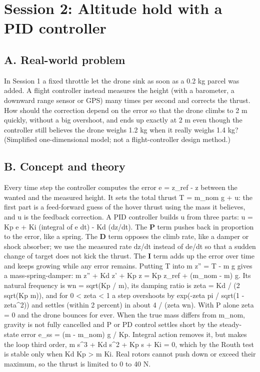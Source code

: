 \documentclass[11pt,a4paper]{article}
\begin{document}
\section{Session 2: Altitude hold with a PID controller}

\subsection*{A. Real-world problem}
In Session 1 a fixed throttle let the drone sink as soon as a 0.2 kg parcel was added. A flight controller instead measures the height (with a barometer, a downward range sensor or GPS) many times per second and corrects the thrust. How should the correction depend on the error so that the drone climbs to 2 m quickly, without a big overshoot, and ends up exactly at 2 m even though the controller still believes the drone weighs 1.2 kg when it really weighs 1.4 kg? (Simplified one-dimensional model; not a flight-controller design method.)

\subsection*{B. Concept and theory}
Every time step the controller computes the error e = z\_ref - z between the wanted and the measured height. It sets the total thrust T = m\_nom g + u: the first part is a feed-forward guess of the hover thrust using the mass it believes, and u is the feedback correction. A PID controller builds u from three parts: u = Kp e + Ki (integral of e dt) - Kd (dz/dt). The \textbf{P} term pushes back in proportion to the error, like a spring. The \textbf{D} term opposes the climb rate, like a damper or shock absorber; we use the measured rate dz/dt instead of de/dt so that a sudden change of target does not kick the thrust. The \textbf{I} term adds up the error over time and keeps growing while any error remains. Putting T into m z'' = T - m g gives a mass-spring-damper: m z'' + Kd z' + Kp z = Kp z\_ref + (m\_nom - m) g. Its natural frequency is wn = sqrt(Kp / m), its damping ratio is zeta = Kd / (2 sqrt(Kp m)), and for 0 < zeta < 1 a step overshoots by exp(-zeta pi / sqrt(1 - zeta\textasciicircum{}2)) and settles (within 2 percent) in about 4 / (zeta wn). With P alone zeta = 0 and the drone bounces for ever. When the true mass differs from m\_nom, gravity is not fully cancelled and P or PD control settles short by the steady-state error e\_ss = (m - m\_nom) g / Kp. Integral action removes it, but makes the loop third order, m s\textasciicircum{}3 + Kd s\textasciicircum{}2 + Kp s + Ki = 0, which by the Routh test is stable only when Kd Kp > m Ki. Real rotors cannot push down or exceed their maximum, so the thrust is limited to 0 to 40 N.
\end{document}
